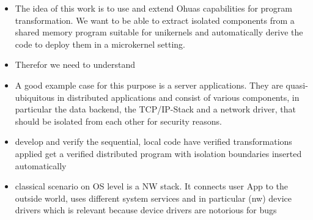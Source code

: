 \begin{itemize}
    \item The idea of this work is to use and extend Ohuas capabilities for program transformation. We want to be able to extract isolated components from a shared memory program suitable for unikernels and automatically derive the code to deploy them in a microkernel setting. 

    \item Therefor we need to understand 

    \item A good example case for this purpose is a server applications. They are quasi-ubiquitous in distributed applications and consist of various components, in particular the data backend, the TCP/IP-Stack and a network driver, that should be isolated from each other for security reasons. 
    
    \item develop and verify the sequential, local code \means have verified transformations applied \means get a verified distributed program with isolation boundaries inserted automatically
    \item classical scenario on OS level is a NW stack. It connects user App to the outside world, uses different system services and in particular (nw) device drivers which is relevant because device drivers are notorious for bugs
\end{itemize}

